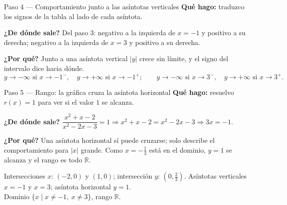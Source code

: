 \documentclass[11pt]{article}
\begin{document}
\begin{paso}{Paso 4 --- Comportamiento junto a las asíntotas verticales}
\textbf{Qué hago:} traduzco los signos de la tabla al lado de cada asíntota.

\textbf{¿De dónde sale?} Del paso 3: negativo a la izquierda de $x=-1$ y positivo a su derecha; negativo a la izquierda de $x=3$ y positivo a su derecha.

\textbf{¿Por qué?} Junto a una asíntota vertical $|y|$ crece sin límite, y el signo del intervalo dice hacia dónde.
\[
y\to-\infty \text{ si } x\to-1^-,\quad y\to+\infty \text{ si } x\to-1^+;\qquad
y\to-\infty \text{ si } x\to3^-,\quad y\to+\infty \text{ si } x\to3^+.
\]
\end{paso}

\begin{paso}{Paso 5 --- Rango: la gráfica cruza la asíntota horizontal}
\textbf{Qué hago:} resuelvo $r(x)=1$ para ver si el valor $1$ se alcanza.

\textbf{¿De dónde sale?} $\dfrac{x^2+x-2}{x^2-2x-3}=1 \Rightarrow x^2+x-2=x^2-2x-3 \Rightarrow 3x=-1$.

\textbf{¿Por qué?} Una asíntota horizontal sí puede cruzarse; solo describe el comportamiento para $|x|$ grande. Como $x=-\tfrac13$ está en el dominio, $y=1$ se alcanza y el rango es todo $\mathbb{R}$.
\end{paso}

\begin{center}
\end{center}

\begin{resp}
Intersecciones $x$: $(-2,0)$ y $(1,0)$; intersección $y$: $\left(0,\tfrac23\right)$. Asíntotas verticales $x=-1$ y $x=3$; asíntota horizontal $y=1$.\\
Dominio $\{x\mid x\ne -1,\ x\ne 3\}$, rango $\mathbb{R}$.
\end{resp}
\end{document}
